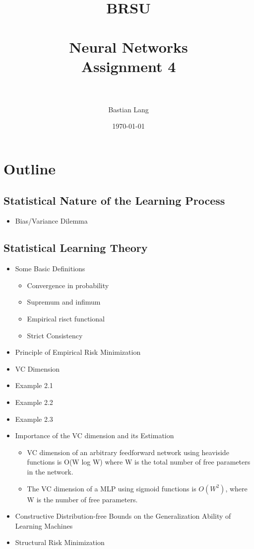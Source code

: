 \documentclass[paper=a4, fontsize=11pt]{scrartcl} %
\title{	
\normalfont \normalsize 
\textsc{BRSU} \\ [25pt] %
\horrule{0.5pt} \\[0.4cm] %
\huge Neural Networks\\Assignment 4 \\ %
\horrule{2pt} \\[0.5cm] %
}
\author{Bastian Lang} %
\date{\normalsize\today} %
\numberwithin{equation}{section} %
\numberwithin{figure}{section} %
\numberwithin{table}{section} %
\begin{document}
\maketitle %

\newpage

\section{Outline}

\subsection{Statistical Nature of the Learning Process}

\begin{itemize}
	\item Bias/Variance Dilemma
\end{itemize}

\subsection{Statistical Learning Theory}
\begin{itemize}
	\item Some Basic Definitions
	\begin{itemize}
		\item Convergence in probability
		\item Supremum and infimum
		\item Empirical risct functional
		\item Strict Consistency
	\end{itemize}
	\item Principle of Empirical Risk Minimization
	\item VC Dimension
	\item Example 2.1
	\item Example 2.2
	\item Example 2.3
	\item Importance of the VC dimension and its Estimation
	\begin{itemize}
		\item VC dimension of an arbitrary feedforward network using heaviside functions is O(W log W) where W is the total number of free parameters in the network.
		\item The VC dimension of a MLP using sigmoid functions is $O(W^2)$, where W is the number of free parameters.
	\end{itemize}
	\item Constructive Distribution-free Bounds on the Generalization Ability of Learning Machines
	\item Structural Risk Minimization
\end{itemize}
\end{document}
